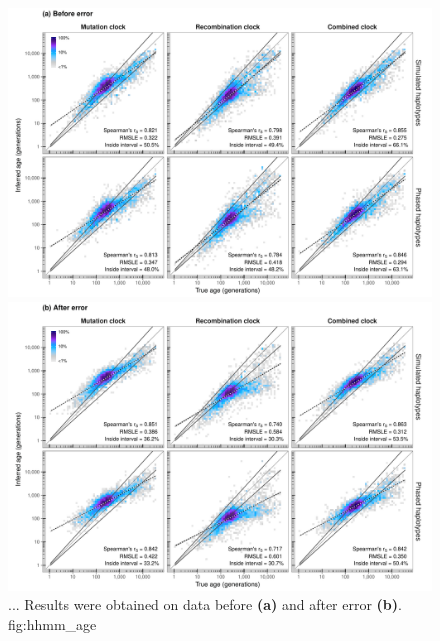 

\begin{figure}[p]
\includegraphics[width=\textwidth]{./img/ch5/hhmm_age_A}
\includegraphics[width=\textwidth]{./img/ch5/hhmm_age_B}
{...
Results were obtained on data before \textbf{(a)} and after error \textbf{(b)}.}
{fig:hhmm_age}
\end{figure}
